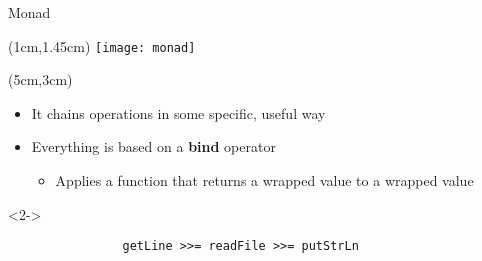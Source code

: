 \begin{frame}[fragile]{Monad}
	\begin{textblock*}{5cm}(1cm,1.45cm)
		\texttt{[image: monad]}
	\end{textblock*}
	\begin{textblock*}{5cm}(5cm,3cm)
		\begin{itemize}
			\item It chains operations in some specific, useful way
			\item Everything is based on a \textbf{bind} operator
			\begin{itemize}
				\item Applies a function that returns a wrapped value to a wrapped value
			\end{itemize}
		\end{itemize}
		\begin{onlyenv}<2->
			\begin{lstlisting}
				getLine >>= readFile >>= putStrLn
			\end{lstlisting}
		\end{onlyenv}
	\end{textblock*}
\end{frame}